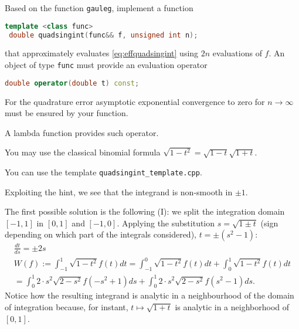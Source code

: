 \begin{problem}
 \begin{subproblem}[3] \label{subprb:effquadsingint}
  Based on the function \verb|gauleg|, implement a \Cpp{} function
 \begin{lstlisting}[language=c++]
 template <class func>
 double quadsingint(func&& f, unsigned int n);
 \end{lstlisting}
 that approximately evaluates \eqref{eq:effquadsingint} using $2n$ evaluations of $f$. An object of type \verb|func| must provide an evaluation operator
 \begin{lstlisting}[language=c++]
 double operator(double t) const;
 \end{lstlisting}
 For the quadrature error asymptotic exponential convergence to zero for
 $n \rightarrow \infty$ must be ensured by your function.
 
 
 \begin{hint}
  A \Cpp{} lambda function provides such operator.
 \end{hint}
 
 \begin{hint}
   You may use the classical binomial formula
   $\sqrt{1 - t^2} = \sqrt{ 1 - t} \sqrt{1 + t}$.
 \end{hint}
 
  \cprotEnv \begin{hint}
  You can use the template \verb|quadsingint_template.cpp|.
  \end{hint}

  \cprotEnv \begin{solution}
   Exploiting the hint, we see that the integrand is non-smooth in $\pm 1$. 
   
   The first possible solution is the following (I): we split the integration domain $[-1,1]$ in $[0,1]$ and $[-1,0]$. Applying the substitution $s = \sqrt{1 \pm t}$ (sign depending on which part of the integrals considered), $t = \pm(s^2 - 1)$:
   \begin{align*}
    \frac{dt}{ds} = \pm2s \\
    W(f) := \int_{-1}^1 \sqrt{1 - t^2} f(t) dt = \int_{-1}^0 \sqrt{1 - t^2} f(t) dt + \int_0^1 \sqrt{1 - t^2} f(t) dt \\
    = \int_0^{1} 2 \cdot s^2 \sqrt{2 - s^2} f(-s^2+1) ds + \int_0^{1} 2 \cdot s^2 \sqrt{2 - s^2} f(s^2-1) ds.
   \end{align*}
   Notice how the resulting integrand is analytic in a neighbourhood of the domain
   of integration because, for instant, {$t\mapsto \sqrt{1+t}$} is analytic
   in a neighborhood of $[0,1]$. 
   

\end{solution}
\end{subproblem}
\end{problem}
